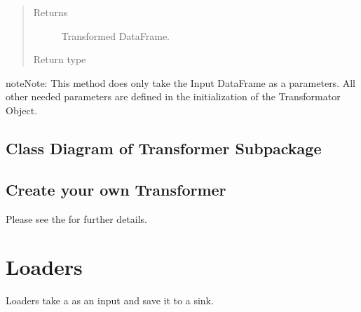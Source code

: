 \documentclass[a4paper,10pt, twoside,english]{sphinxmanual}
\begin{document}
\begin{fulllineitems}
\begin{fulllineitems}
\begin{quote}
\begin{description}
\item[{Returns}] \leavevmode
Transformed DataFrame.

\item[{Return type}] \leavevmode
{}

\end{description}\end{quote}

\begin{sphinxadmonition}{note}{Note:}
This method does only take the Input DataFrame as a parameters. All other needed parameters
are defined in the initialization of the Transformator Object.
\end{sphinxadmonition}

\end{fulllineitems}


\end{fulllineitems}



\subsection{Class Diagram of Transformer Subpackage}
\label{\detokenize{transformer/overview:class-diagram-of-transformer-subpackage}}
\noindent{}


\subsection{Create your own Transformer}
\label{\detokenize{transformer/overview:create-your-own-transformer}}
Please see the {\hyperref[\detokenize{base_classes/transformer:custom-transformer}]{}} for further details.


\section{Loaders}
\label{\detokenize{loader/overview:module-spooq2.loader.loader}}\label{\detokenize{loader/overview:loaders}}\label{\detokenize{loader/overview::doc}}
Loaders take a  as an input and save it to a sink.
\end{document}
